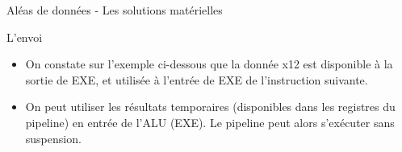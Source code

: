 %
\begin{Frame}{Aléas de données - Les solutions matérielles}

  \begin{block}{L'envoi}
    \begin{center}
      \begin{itemize}
      \item On constate sur l'exemple ci-dessous que la donnée x12 est
        disponible à la sortie de EXE, et utilisée à l'entrée de EXE
        de l'instruction suivante.
      \item On peut utiliser les résultats temporaires (disponibles
        dans les registres du pipeline) en entrée de l'ALU (EXE). Le
        pipeline peut alors s'exécuter sans suspension.
        \end{itemize}
       \end{center}
      \end{block}   



\end{Frame}


